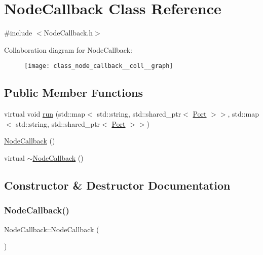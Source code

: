 \hypertarget{class_node_callback}{}\section{Node\+Callback Class Reference}
\label{class_node_callback}


{\ttfamily \#include $<$Node\+Callback.\+h$>$}



Collaboration diagram for Node\+Callback\+:\nopagebreak
\begin{figure}[H]
\begin{center}
\leavevmode
\texttt{[image: class\_node\_callback\_\_coll\_\_graph]}
\end{center}
\end{figure}
\subsection*{Public Member Functions}
\begin{DoxyCompactItemize}
\item 
virtual void \hyperlink{class_node_callback_a94eb8c2fd7162ffcc4abff8bd2e852b3}{run} (std\+::map$<$ std\+::string, std\+::shared\+\_\+ptr$<$ \hyperlink{class_port}{Port} $>$$>$, std\+::map$<$ std\+::string, std\+::shared\+\_\+ptr$<$ \hyperlink{class_port}{Port} $>$$>$)
\item 
\hyperlink{class_node_callback_a91f8bc71a7bc6164d831ab4fb8144810}{Node\+Callback} ()
\item 
virtual \hyperlink{class_node_callback_ac9474867612b9fa6327dfe5cc5d29bec}{$\sim$\+Node\+Callback} ()
\end{DoxyCompactItemize}


\subsection{Constructor \& Destructor Documentation}
\mbox{\label{class_node_callback_a91f8bc71a7bc6164d831ab4fb8144810}} 
\subsubsection{\texorpdfstring{Node\+Callback()}{NodeCallback()}}
{\footnotesize\ttfamily Node\+Callback\+::\+Node\+Callback (\begin{DoxyParamCaption}{ }\end{DoxyParamCaption})\hspace{0.3cm}{\ttfamily [inline]}}

